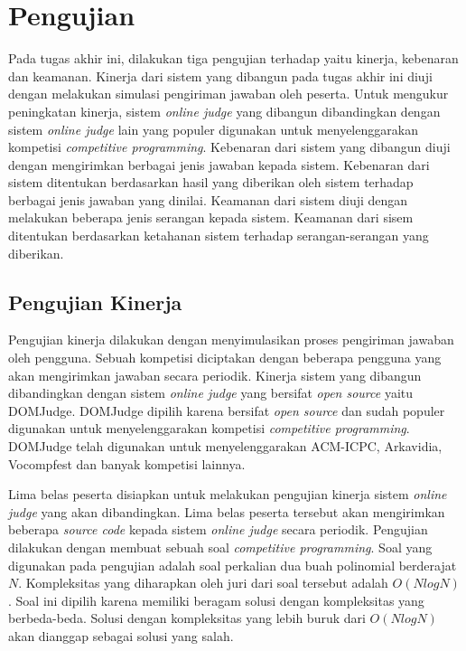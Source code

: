 \section{Pengujian}

\par Pada tugas akhir ini, dilakukan tiga pengujian terhadap yaitu kinerja, kebenaran dan keamanan. Kinerja dari sistem yang dibangun pada tugas akhir ini diuji dengan melakukan simulasi pengiriman jawaban oleh peserta. Untuk mengukur peningkatan kinerja, sistem \textit{online judge} yang dibangun dibandingkan dengan sistem \textit{online judge} lain yang populer digunakan untuk menyelenggarakan kompetisi \textit{competitive programming}. Kebenaran dari sistem yang dibangun diuji dengan mengirimkan berbagai jenis jawaban kepada sistem. Kebenaran dari sistem ditentukan berdasarkan hasil yang diberikan oleh sistem terhadap berbagai jenis jawaban yang dinilai. Keamanan dari sistem diuji dengan melakukan beberapa jenis serangan kepada sistem. Keamanan dari sisem ditentukan berdasarkan ketahanan sistem terhadap serangan-serangan yang diberikan.

\subsection{Pengujian Kinerja}

\par Pengujian kinerja dilakukan dengan menyimulasikan proses pengiriman jawaban oleh pengguna. Sebuah kompetisi diciptakan dengan beberapa pengguna yang akan mengirimkan jawaban secara periodik. Kinerja sistem yang dibangun dibandingkan dengan sistem \textit{online judge} yang bersifat \textit{open source} yaitu DOMJudge. DOMJudge dipilih karena bersifat \textit{open source} dan sudah populer digunakan untuk menyelenggarakan kompetisi \textit{competitive programming}. DOMJudge telah digunakan untuk menyelenggarakan ACM-ICPC, Arkavidia, Vocompfest dan banyak kompetisi lainnya.

\par Lima belas peserta disiapkan untuk melakukan pengujian kinerja sistem \textit{online judge} yang akan dibandingkan. Lima belas peserta tersebut akan mengirimkan beberapa \textit{source code} kepada sistem \textit{online judge} secara periodik. Pengujian dilakukan dengan membuat sebuah soal \textit{competitive programming}. Soal yang digunakan pada pengujian adalah soal perkalian dua buah polinomial berderajat $N$. Kompleksitas yang diharapkan oleh juri dari soal tersebut adalah $O(N log N)$. Soal ini dipilih karena memiliki beragam solusi dengan kompleksitas yang berbeda-beda. Solusi dengan kompleksitas yang lebih buruk dari $O(N log N)$ akan dianggap sebagai solusi yang salah.

